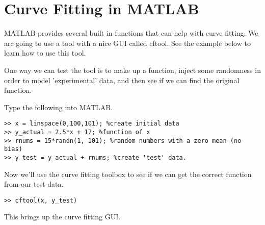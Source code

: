 \documentclass[paper=a4, fontsize=11pt]{scrartcl} %
\numberwithin{equation}{section} %
\numberwithin{figure}{section} %
\numberwithin{table}{section} %
\begin{document}
\section{Curve Fitting in MATLAB}
MATLAB provides several built in functions that can help with curve fitting.
We are going to use a tool with a nice GUI called cftool.
See the example below to learn how to use this tool.

One way we can test the tool is to make up a function, inject some randomness in order to model 'experimental' data, and then see if we can find the original function.

Type the following into MATLAB.
\begin{verbatim}
>> x = linspace(0,100,101); %create initial data
>> y_actual = 2.5*x + 17; %function of x
>> rnums = 15*randn(1, 101); %random numbers with a zero mean (no bias)
>> y_test = y_actual + rnums; %create 'test' data.
\end{verbatim}

Now we'll use the curve fitting toolbox to see if we can get the correct function from our test data.
\begin{verbatim}
>> cftool(x, y_test)
\end{verbatim}

This brings up the curve fitting GUI. 
\end{document}

